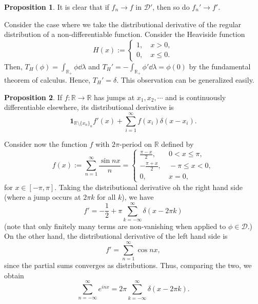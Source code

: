 \documentclass[]{article}
\theoremstyle{definition}
\theoremstyle{definition}
\newtheorem{proposition}{Proposition}[section]
\begin{document}
\begin{proposition}
  It is clear that if \(f_n \to f\) in \(\mathcal{D}'\), then so do \(f_n' \to f'\).
\end{proposition}

Consider the case where we take the distributional derivative of the regular 
distribution of a non-differentiable function. Consider the Heaviside function 
\[H(x) := \begin{cases}
  1, & \ x > 0,\\
  0, & \ x \le 0.
\end{cases}\]
Then, \(T_H(\phi) = \int_{\mathbb{R}_+} \phi \dd \lambda\) and 
\(T_H' = -  \int_{\mathbb{R}_+} \phi' \dd \lambda = \phi(0)\) by the fundamental 
theorem of calculus. Hence, \(T_H' = \delta\). This observation can be generalized 
easily. 

\begin{proposition}
  If \(f : \mathbb{R} \to \mathbb{R}\) has jumps at \(x_1, x_2, \cdots\) and 
  is continuously differentiable elsewhere, its distributional derivative is 
  \[\mathbf{1}_{\mathbb{R} \setminus \{x_n\}_n}
    f'(x) + \sum_{i = 1}^\infty f(x_i)\delta(x - x_i).\]
\end{proposition}

Consider now the function \(f\) with \(2\pi\)-period on \(\mathbb{R}\) defined by 
\[f(x) := \sum_{n = 1}^\infty \frac{\sin nx}{n} = 
  \begin{cases}
    \frac{\pi - x}{2}, & \ 0 < x \le \pi,\\
    -\frac{\pi + x}{2}, & \ -\pi \le x < 0,\\
    0, & \ x = 0,
  \end{cases}\]
for \(x \in [-\pi, \pi]\). Taking the distributional derivative oh the right hand 
side (where a jump occurs at \(2\pi k\) for all \(k\)), we have 
\[f' = - \frac{1}{2} + \pi\sum_{k = -\infty}^\infty \delta(x - 2\pi k)\]
(note that only finitely many terms are non-vanishing when applied to 
\(\phi \in \mathcal{D}\).) On the other hand, the distributional derivative 
of the left hand side is 
\[f' = \sum_{n = 1}^\infty \cos nx,\]
since the partial sums converges as distributions. Thus, comparing the 
two, we obtain 
\[\sum_{n = -\infty}^\infty e^{inx} = 2\pi \sum_{k = -\infty}^\infty \delta(x - 2\pi k).\]
\end{document}
